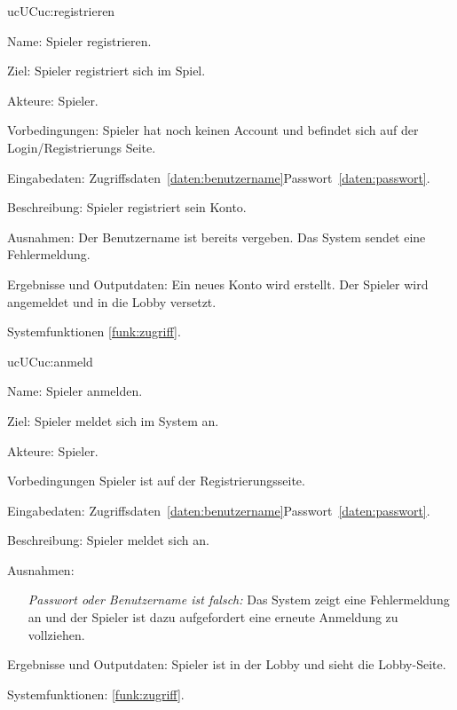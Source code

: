 \begin{description}[leftmargin=5em, style=sameline]

	\begin{lhp}{uc}{UC}{uc:registrieren}
		\item [Name:] Spieler registrieren.
		\item [Ziel:] Spieler registriert sich im Spiel.
		\item [Akteure:] Spieler.
		\item [Vorbedingungen:] Spieler hat noch keinen Account und befindet sich auf der Login/Registrierungs Seite.
		\item [Eingabedaten:] Zugriffsdaten~\ref{daten:benutzername}Passwort~\ref{daten:passwort}.
		\item [Beschreibung:] Spieler registriert sein Konto.
		\item [Ausnahmen:] Der Benutzername ist bereits vergeben. Das System sendet eine Fehlermeldung.
		\item [Ergebnisse und Outputdaten:] Ein neues Konto wird erstellt. Der Spieler wird angemeldet und in die Lobby versetzt. 
		\item [Systemfunktionen] \ref{funk:zugriff}.
	\end{lhp}
	
	\begin{lhp}{uc}{UC}{uc:anmeld}
		\item [Name:] Spieler anmelden.
		\item [Ziel:] Spieler meldet sich im System an.
		\item [Akteure:] Spieler.
		\item [Vorbedingungen] Spieler ist auf der Registrierungsseite.
		\item [Eingabedaten:] Zugriffsdaten~\ref{daten:benutzername}Passwort~\ref{daten:passwort}.
		\item [Beschreibung:] Spieler meldet sich an.							
		\item [Ausnahmen:] \hfill
			\begin{itemize} 
				\item[] \textit{Passwort oder Benutzername ist falsch:} Das System zeigt eine Fehlermeldung an und der Spieler ist dazu aufgefordert eine erneute Anmeldung zu vollziehen.
				
			\end{itemize}
		\item [Ergebnisse und Outputdaten:] Spieler ist in der Lobby und sieht die Lobby-Seite.
		\item [Systemfunktionen:] \ref{funk:zugriff}.
	\end{lhp}
	

\end{description}
